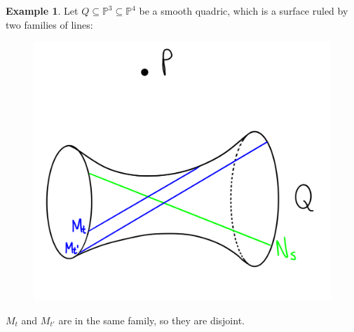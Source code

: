 \documentclass[12pt,a4paper]{amsart}
\theoremstyle{plain}
\theoremstyle{definition}
\newtheorem{exmp}[thm]{Example}
\theoremstyle{remark}
\begin{document}
\begin{exmp}
    Let $Q\subseteq \mathbb{P}^{3}\subseteq \mathbb{P}^{4}$ be a smooth quadric, which is a surface ruled by two families of lines:
    \begin{figure}[H]
	\centering
	\includegraphics[scale=.2]{pictures/quadric}
    \end{figure}
    $M_{t}$ and $M_{t'}$ are in the same family, so they are disjoint.


\end{exmp}
\end{document}
